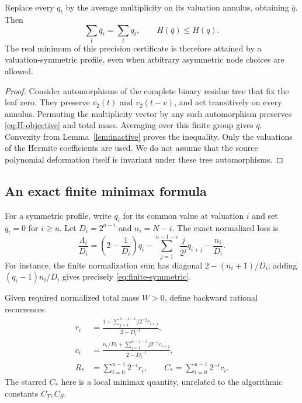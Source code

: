 \begin{theorem}
\label{thm:hermite-symmetry}
Replace every $q_t$ by the average multiplicity on its valuation
annulus, obtaining $\overline q$. Then
\[
 \sum_t\overline q_t=\sum_tq_t,\qquad
 H(\overline q)\le H(q).
\]
The real minimum of this precision certificate is therefore attained
by a valuation-symmetric profile, even when arbitrary asymmetric
node choices are allowed.
\end{theorem}
\begin{proof}
Consider automorphisms of the complete binary residue tree that fix
the leaf zero. They preserve $v_2(t)$ and $v_2(t-v)$, and act
transitively on every annulus. Permuting the multiplicity vector by
any such automorphism preserves \eqref{eq:H-objective} and total mass.
Averaging over this finite group gives $\overline q$. Convexity from
Lemma~\ref{lem:inactive} proves the inequality.
Only the valuations of the Hermite coefficients are used. We do not
assume that the source polynomial deformation itself is invariant
under these tree automorphisms.
\end{proof}

\subsection{An exact finite minimax formula}

For a symmetric profile, write $q_i$ for its common value at
valuation $i$ and set $q_i=0$ for $i\ge u$. Let
$D_i=2^{a-i}$ and $n_i=N-i$. The exact normalized loss is
\begin{equation}\label{eq:finite-symmetric}
 \frac{\Lambda_i}{D_i}
 =\left(2-\frac1{D_i}\right)q_i
  -\sum_{j=1}^{u-1-i}\frac{j}{2^j}q_{i+j}
  -\frac{n_i}{D_i}.
\end{equation}
For instance, the finite normalization sum has diagonal
$2-(n_i+1)/D_i$; adding $(q_i-1)n_i/D_i$ gives precisely
\eqref{eq:finite-symmetric}.

Given required normalized total mass $W>0$, define backward rational
recurrences
\begin{align}
 r_i&=\frac{1+\sum_{j=1}^{u-1-i}j2^{-j}r_{i+j}}
                   {2-D_i^{-1}},\label{eq:r-rec}\\
 c_i&=\frac{n_i/D_i+\sum_{j=1}^{u-1-i}j2^{-j}c_{i+j}}
                   {2-D_i^{-1}},\label{eq:c-rec}\\
 R_*&=\sum_{i=0}^{u-1}2^{-i}r_i,\qquad
 C_*=\sum_{i=0}^{u-1}2^{-i}c_i.\label{eq:RC}
\end{align}
The starred $C_*$ here is a local minimax quantity, unrelated to
the algorithmic constants $C_T,C_S$.

